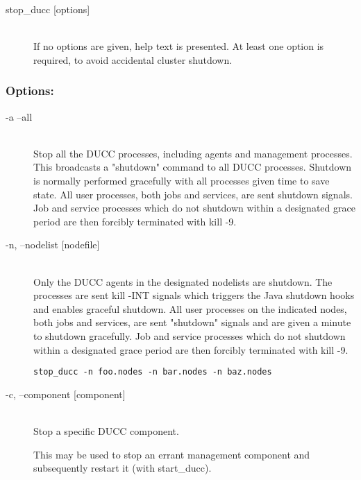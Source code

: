     \begin{description}
      \item[stop\_ducc {[options]}] \hfill \\ 
        If no options are given, help text is presented. At least one option is required, to avoid 
        accidental cluster shutdown. 
      \end{description}
    

      \subsubsection{Options:}
        \begin{description}

          \item[-a --all] \hfill \\
            Stop all the DUCC processes, including agents and management processes. This 
            broadcasts a "shutdown" command to all DUCC processes. Shutdown is normally 
            performed gracefully with all processes given time to save state. 
            All user processes, both jobs and services, are sent shutdown signals. Job and service 
            processes which do not shutdown within a designated grace period are then forcibly 
            terminated with kill -9. 
            
          \item[-n, --nodelist {[nodefile]}] \hfill \\
            Only the DUCC agents in the designated nodelists are shutdown. The processes are sent 
            kill -INT signals which triggers the Java shutdown hooks and enables graceful shutdown. 
            All user processes on the indicated nodes, both jobs and services, are sent "shutdown" 
            signals and are given a minute to shutdown gracefully. Job and service processes which do 
            not shutdown within a designated grace period are then forcibly terminated with kill -9. 
            
\begin{verbatim}
stop_ducc -n foo.nodes -n bar.nodes -n baz.nodes 
\end{verbatim}

          \item[-c, --component {[component]}] \hfill \\
            Stop a specific DUCC component. 

            This may be used to stop an errant management component and subsequently restart it 
            (with start\_ducc). 
            

\end{description}

